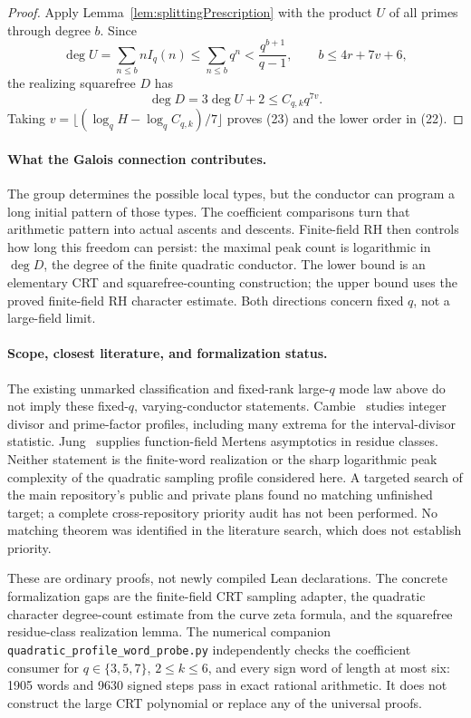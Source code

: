 \documentclass[11pt]{article}
\begin{document}
\begin{proof}
Apply Lemma~\ref{lem:splittingPrescription} with the product \(U\)
of all primes through degree \(b\). Since
\[
 \deg U=\sum_{n\leq b}nI_q(n)
     \leq\sum_{n\leq b}q^n<\frac{q^{b+1}}{q-1},
 \qquad b\leq4r+7v+6,
\]
the realizing squarefree \(D\) has
\[
 \deg D=3\deg U+2
       \leq C_{q,k}q^{7v}.
\]
Taking
\(v=\lfloor(\log_q H-\log_q C_{q,k})/7\rfloor\)
proves (23) and the lower order in (22).
\end{proof}

\paragraph{What the Galois connection contributes.}
The group determines the possible local types, but the conductor can
program a long initial pattern of those types. The coefficient comparisons
turn that arithmetic pattern into actual ascents and descents.
Finite-field RH then controls how long this freedom can persist:
the maximal peak count is logarithmic in \(\deg D\), the degree
of the finite quadratic conductor. The lower bound is an elementary
CRT and squarefree-counting construction; the upper bound uses
the proved finite-field RH character estimate. Both directions concern
fixed \(q\), not a large-field limit.

\paragraph{Scope, closest literature, and formalization status.}
The existing unmarked classification and fixed-rank large-\(q\) mode
law above do not imply these fixed-\(q\), varying-conductor statements.
Cambie~\cite{Cambie} studies integer divisor and prime-factor profiles,
including many extrema for the interval-divisor statistic.
Jung~\cite{Jung} supplies function-field Mertens asymptotics in residue
classes. Neither statement is the finite-word realization or the sharp
logarithmic peak complexity of the quadratic sampling profile considered
here. A targeted search of the main repository's public and private
plans found no matching unfinished target; a complete cross-repository
priority audit has not been performed. No matching theorem was identified
in the literature search, which does not establish priority.

These are ordinary proofs, not newly compiled Lean declarations.
The concrete formalization gaps are the finite-field CRT sampling adapter,
the quadratic character degree-count estimate from the curve zeta formula,
and the squarefree residue-class realization lemma. The numerical companion
\texttt{quadratic\_profile\_word\_probe.py} independently checks the
coefficient consumer for \(q\in\{3,5,7\}\), \(2\leq k\leq6\),
and every sign word of length at most six: 1905 words and 9630 signed
steps pass in exact rational arithmetic. It does not construct the
large CRT polynomial or replace any of the universal proofs.
\end{document}
